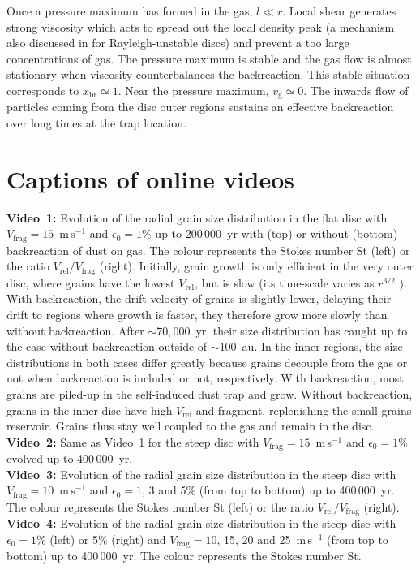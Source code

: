 \documentclass[a4paper,fleqn,usenatbib]{mnras}
\newcommand{\Vrel}{V_\mathrm{rel}}    %
\newcommand{\Vfrag}{V_\mathrm{frag}}  %
\begin{document}
Once a pressure maximum has formed in the gas, $l \ll r$. Local shear generates strong viscosity which acts to spread out the local density peak (a mechanism also discussed in \citealt{Yang2010} for Rayleigh-unstable discs) and prevent a too large concentrations of gas. The pressure maximum is stable and the gas flow is almost stationary when viscosity counterbalances the backreaction. This stable situation corresponds to $x_\mathrm{br} \simeq 1$. Near the pressure maximum, $v_\mathrm{g} \simeq 0$. The inwards flow of particles coming from the disc outer regions sustains an effective backreaction over long times at the trap location.

\section{Captions of online videos}

\noindent\textbf{Video~1:} Evolution of the radial grain size distribution in the flat disc with $\Vfrag=15$~m\,s$^{-1}$ and $\epsilon_0=1$\% up to 200\,000~yr with (top) or without (bottom) backreaction of dust on gas. The colour represents the Stokes number St (left) or the ratio $\Vrel/\Vfrag$ (right). Initially, grain growth is only efficient in the very outer disc, where grains have the lowest $\Vrel$, but is slow (its time-scale varies as $r^{3/2}$ \citep{Laibe2008}). With backreaction, the drift velocity of grains is slightly lower, delaying their drift to regions where growth is faster, they therefore grow more slowly than without backreaction. After $\sim70,000$~yr, their size distribution has caught up to the case without backreaction outside of $\sim100$~au. In the inner regions, the size distributions in both cases differ greatly because grains decouple from the gas or not when backreaction is included or not, respectively. With backreaction, most grains are piled-up in the self-induced dust trap and grow. Without backreaction, grains in the inner disc have high $\Vrel$ and fragment, replenishing the small grains reservoir. Grains thus stay well coupled to the gas and remain in the disc.
\\

\noindent\textbf{Video~2:} Same as Video~1 for the steep disc with $\Vfrag=15$~m\,s$^{-1}$ and $\epsilon_0=1$\% evolved up to 400\,000~yr.
\\

\noindent\textbf{Video~3:} Evolution of the radial grain size distribution in the steep disc with $\Vfrag=10$~m\,s$^{-1}$ and $\epsilon_0=1$, 3 and 5\% (from top to bottom) up to 400\,000~yr. The colour represents the Stokes number St (left) or the ratio $\Vrel/\Vfrag$ (right).
\\

\noindent\textbf{Video~4:} Evolution of the radial grain size distribution in the steep disc with $\epsilon_0=1\%$ (left) or 5\% (right) and $\Vfrag=10$, 15, 20 and 25~m\,s$^{-1}$ (from top to bottom) up to 400\,000~yr. The colour represents the Stokes number St.

\bsp	%
\label{lastpage}
\end{document}
